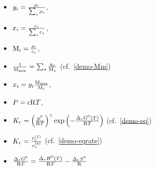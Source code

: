 \begin{itemize}
\item $\massfrac[i] = \frac{\mass[i]}{\sum_s \mass[s]}$,
\item $\molarfrac[i] = \frac{\molar[i]}{\sum_s \molar[s]}$,
\item $\Mm[i] = \frac{\mass[i]}{\molar[i]}$,
\item $\frac{1}{\Mm[\text{mix}]} = \sum_s \frac{\massfrac[s]}{\Mm[s]}$ (cf.~\ref{demo-Mm})
\item $\molarfrac[i] = \massfrac[i] \frac{\Mm[\text{mix}]}{\Mm[i]}$,
\item $\Press = \molar\Rg \Temp$,
\item $\Eqconst[r] = \left(\frac{\pz}{\Rg \Temp}\right)^\gamma \exp\left(-\frac{\DGibbsZ[r](\Temp)}{\Rg \Temp}\right)$ (cf.~\ref{demo-eq})
\item $\Eqconst[r] = \frac{\fwdrate[r]}{\bkwdrate[r]}$ (cf.~\ref{demo-eqrate})
\item $\frac{\DGibbsZ[r]}{\Rg \Temp} = \frac{\DenthZ[r](\Temp)}{\Rg \Temp} - \frac{\DentrZ[r]}{\Rg}$
\end{itemize}

